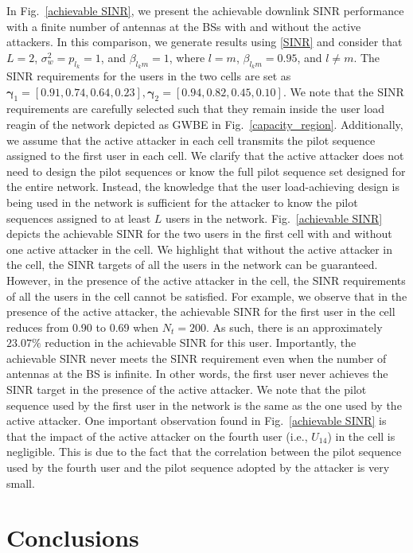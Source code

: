 \documentclass[conference]{IEEEtran}
\begin{document}
In Fig.~\ref{achievable SINR}, we present the achievable downlink SINR performance with a finite number of antennas at the BSs with and without the active attackers. In this comparison, we generate results using \eqref{SINR} and consider that $L=2$, $\sigma_{w}^{2}=p_{l_{k}}=1$, and $\beta_{l_{k}m}=1$, where $l=m$, $\beta_{l_{k}m}=0.95$, and $l\neq m$. The SINR requirements for the users in the two cells are set as $\pmb{\gamma}_{1}=\left[0.91, 0.74, 0.64, 0.23\right], \pmb{\gamma}_{2}=\left[0.94, 0.82, 0.45, 0.10\right]$. We note that the SINR requirements are carefully selected such that they remain inside the user load reagin of the network depicted as GWBE in Fig.~\ref{capacity_region}. Additionally, we assume that the active attacker in each cell transmits the pilot sequence assigned to the first user in each cell. We clarify that the active attacker does not need to design the pilot sequences or know the full pilot sequence set designed for the entire network. Instead, the knowledge that the user load-achieving design is being used in the network is sufficient for the attacker to know the pilot sequences assigned to at least $L$ users in the network. Fig.~\ref{achievable SINR} depicts the achievable SINR for the two users in the first cell with and without one active attacker in the cell. We highlight that without the active attacker in the cell, the SINR targets of all the users in the network can be guaranteed. However, in the presence of the active attacker in the cell, the SINR requirements of all the users in the cell cannot be satisfied. For example, we observe that in the presence of the active attacker, the achievable SINR for the first user in the cell reduces from 0.90 to 0.69 when $N_t=200$. As such, there is an approximately $23.07\%$ reduction in the achievable SINR for this user. Importantly, the achievable SINR never meets the SINR requirement even when the number of antennas at the BS is infinite. In other words, the first user never achieves the SINR target in the presence of the active attacker. We note that the pilot sequence used by the first user in the network is the same as the one used by the active attacker. One important observation found  in Fig.~\ref{achievable SINR} is that the impact of the active attacker on the fourth user (i.e., $U_{14}$) in the cell is negligible. This is due to the fact that the correlation between the pilot sequence used by the fourth user and the pilot sequence adopted by the attacker is very small.

\section{Conclusions}\label{sec:con}
\end{document}
